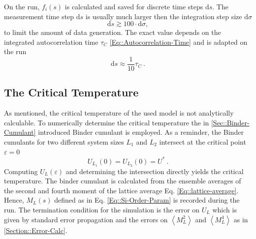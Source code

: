 	 On the run, $f_i(s)$ is calculated and saved for discrete time steps $\text{d}s$. The measurement time step $\text{d}s$ is usually much larger then the integration step size $\text{d}\sigma$
	 \begin{equation}
	 	\text{d}s \gtrsim 100 \cdot \text{d}\sigma,
	 \end{equation}
	 to limit the amount of data generation. The exact value depends on the integrated autocorrelation time $\tau_C$ \eqref{Eq::Autocorrelation-Time} and is adapted on the run
	 \begin{equation}
	 	 \text{d}s \approx \frac{1}{10} \tau_C~.
	 \end{equation}
	\subsection{The Critical Temperature} \label{Section::crit-temp}
		As mentioned, the critical temperature of the used model is not analytically calculable. To numerically determine the critical temperature the in \autoref{Sec::Binder-Cumulant} introduced Binder cumulant is employed. As a reminder, the Binder cumulants for two different system sizes $L_1$ and $L_2$ intersect at the critical point $\varepsilon = 0$
		\begin{equation}
			U_{L_1} (0) =	U_{L_2} (0) =	U^*~.
		\end{equation}
		Computing $U_{L}(\varepsilon)$ and determining the intersection directly yields the critical temperature. The binder cumulant is calculated from the ensemble averages of the second and fourth moment of the lattice average Eq. \eqref{Eq::lattice-average}. Hence, $M_L(s)$ defined as in Eq. \eqref{Eq::Si-Order-Param} is recorded during the run. The termination condition for the simulation is the error on $U_L$ which is given by standard error propagation and the errors on $\left \langle M_L^2 \right \rangle$ and $\left \langle M_L^4 \right \rangle$ as in \autoref{Section::Error-Calc}. \\
